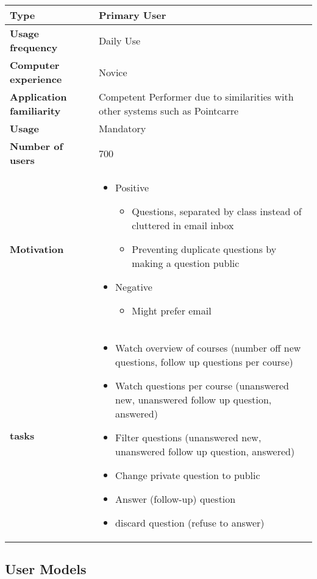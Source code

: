 \documentclass[10pt]{report}
\begin{document}
\begin{tabular}{ | l | p{10cm} |}
\hline
\textbf{Type} & Primary User \\ \hline
\textbf{Usage frequency} & Daily Use \\ \hline
\textbf{Computer experience} & Novice \\ \hline
\textbf{Application familiarity} & Competent Performer due to similarities with other systems such as Pointcarre \\ \hline
\textbf{Usage} & Mandatory\\ \hline
\textbf{Number of users} & 700\\ \hline
\textbf{Motivation} & 
	\begin{itemize}
		\item Positive 
		\begin{itemize}
			\item Questions, separated by class instead of cluttered in email inbox
			\item Preventing duplicate questions by making a question public
		\end{itemize}
		\item Negative 
		\begin{itemize}
			\item Might prefer email
		\end{itemize}
	\end{itemize} \\ \hline
\textbf{tasks} & 
	\begin{itemize}
		\item Watch overview of courses (number off new questions, follow up questions per course)
		\item Watch questions per course (unanswered new, unanswered follow up question, answered)
		\item Filter questions (unanswered new, unanswered follow up question, answered)
		\item Change private question to public
		\item Answer (follow-up) question
		\item discard question (refuse to answer)
	\end{itemize} \\ \hline
\end{tabular}

\subsection{User Models}
\end{document}
